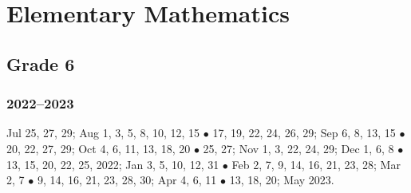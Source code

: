 \documentclass{article}
\begin{document}

\section{Elementary Mathematics}

\subsection{Grade 6}

\subsubsection{2022--2023}
Jul 25, 27, 29; Aug 1, 3, 5, 8, 10, 12, 15 $\bullet$ 17, 19, 22, 24, 26, 29; Sep 6, 8, 13, 15 $\bullet$ 20, 22, 27, 29; Oct 4, 6, 11, 13, 18, 20 $\bullet$ 25, 27; Nov 1, 3, 22, 24, 29; Dec 1, 6, 8 $\bullet$ 13, 15, 20, 22, 25, 2022; Jan 3, 5, 10, 12, 31 $\bullet$ Feb 2, 7, 9, 14, 16, 21, 23, 28; Mar 2, 7 $\bullet$ 9, 14, 16, 21, 23, 28, 30; Apr 4, 6, 11 $\bullet$ 13, 18, 20; May 2023.
\end{document}
